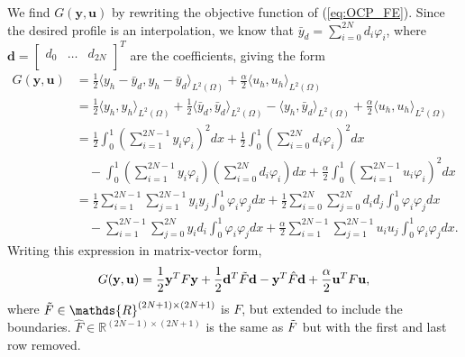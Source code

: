 We find $G(\mathbf{y, u})$ by rewriting the objective function of (\ref{eq:OCP_FE}).
Since the desired profile is an interpolation, we know that $\bar{y}_d = \sum_{i=0}^{2N}d_i\varphi_i$,
where $\mathbf{d} = \begin{bmatrix} d_0 & \dots & d_{2N} \\ \end{bmatrix}^T$
are the coefficients,
giving the form
\begin{align*}
    G(\mathbf{y, u}) &= \frac{1}{2}\langle y_h - \bar{y}_d, y_h - \bar{y}_d \rangle_{L^2{(\Omega)}} + \frac{\alpha}{2} \langle u_h, u_h \rangle_{L^2(\Omega)} \\
   &= \frac{1}{2}\langle y_h , y_h \rangle_{L^2{(\Omega)}} +  \frac{1}{2}\langle \bar{y}_d ,\bar{y}_d  \rangle_{L^2{(\Omega)}}
   - \langle y_h, \bar{y}_d \rangle_{L^2{(\Omega)}} + \frac{\alpha}{2} \langle u_h, u_h \rangle_{L^2(\Omega)} \\
     &= \frac{1}{2}\int_0^1\left( \sum_{i=1}^{2N-1}y_i \varphi_i \right)^2dx  + \frac{1}{2}\int_0^1\left( \sum_{i=0}^{2N}d_i \varphi_i \right)^2dx \\
     &\quad- \int_0^1\left( \sum_{i=1}^{2N-1}y_i \varphi_i \right) \left(\sum_{i=0}^{2N} d_i \varphi_i \right)dx + 
     \frac{\alpha}{2}\int_0^1\left(\sum_{i=1}^{2N-1} u_i \varphi_i  \right)^2dx \\    
     &= \frac{1}{2}\sum_{i=1}^{2N-1}\sum_{j=1}^{2N-1} y_i y_j \int_0^1 \varphi_i \varphi_j dx + \frac{1}{2}\sum_{i=0}^{2N}\sum_{j=0}^{2N} d_i d_j \int_0^1 \varphi_i \varphi_j dx \\
    &\quad- \sum_{i=1}^{2N-1} \sum_{j=0}^{2N} y_i d_i \int_0^1 \varphi_i \varphi_j dx +  \frac{\alpha}{2}\sum_{i=1}^{2N-1}\sum_{j=1}^{2N-1} u_i u_j \int_0^1\varphi_i \varphi_j dx.
\end{align*}
Writing this expression in matrix-vector form,
\begin{equation}
G(\mathbf{y, u}) = \frac{1}{2}\mathbf{y}^T F \mathbf{y} + \frac{1}{2}\mathbf{d}^T\Tilde{F} \mathbf{d} - \mathbf{y}^T\hat{F}\mathbf{d} + \frac{\alpha}{2}\mathbf{u}^T F \mathbf{u},
\end{equation}
where $\Tilde{F} \in \mathds{R}^{(2N+1) \times (2N+1)}$
is $F$, but extended to include the boundaries.
$\hat{F} \in \mathds{R}^{(2N-1) \times (2N+1)}$ is the same as $\Tilde{F}$ but with the first and last row removed.  

